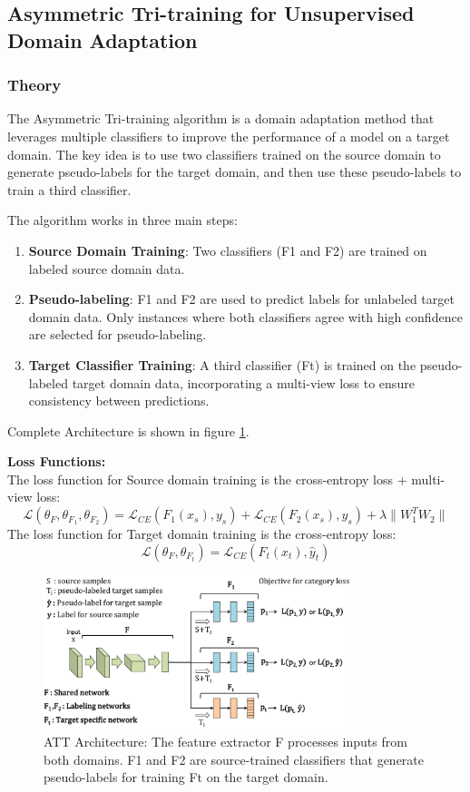 \documentclass{article}
\begin{document}
\subsection*{Asymmetric Tri-training for Unsupervised Domain Adaptation}
\subsubsection*{Theory}
The Asymmetric Tri-training algorithm is a domain adaptation method that leverages multiple classifiers to improve the performance of a model on a target domain. The key idea is to use two classifiers trained on the source domain to generate pseudo-labels for the target domain, and then use these pseudo-labels to train a third classifier. 

The algorithm works in three main steps:

\begin{enumerate}
  \item \textbf{Source Domain Training}: Two classifiers (F1 and F2) are trained on labeled source domain data.
  
  \item \textbf{Pseudo-labeling}: F1 and F2 are used to predict labels for unlabeled target domain data. Only instances where both classifiers agree with high confidence are selected for pseudo-labeling.
  
  \item \textbf{Target Classifier Training}: A third classifier (Ft) is trained on the pseudo-labeled target domain data, incorporating a multi-view loss to ensure consistency between predictions.
\end{enumerate}

Complete Architecture is shown in figure \ref{fig:att_architecture}.

\textbf{Loss Functions:}\\
 The loss function for Source domain training is the cross-entropy loss + multi-view loss:
\[
  \mathcal{L}(\theta_F, \theta_{F_1}, \theta_{F_2}) = \mathcal{L}_{CE}(F_1(x_s), {y}_s) + 
  \mathcal{L}_{CE}(F_2(x_s), {y}_s) + \lambda
  \|W_1^T W_2\|
\]
The loss function for Target domain training is the cross-entropy loss:
\[
  \mathcal{L}(\theta_F, \theta_{F_t}) = \mathcal{L}_{CE}(F_t(x_t), \hat{y}_t)
\]

\begin{figure}[h]
  \centering
  \includegraphics[width=0.8\textwidth]{ATT/ATT_Architecture.png}
  \caption{ATT Architecture: The feature extractor F processes inputs from both domains. F1 and F2 are source-trained classifiers that generate pseudo-labels for training Ft on the target domain.}
  \label{fig:att_architecture}
\end{figure}
\end{document}
